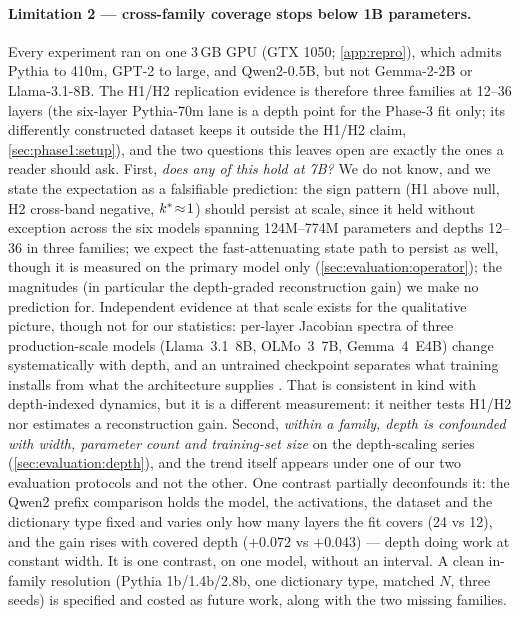 \paragraph{Limitation 2 --- cross-family coverage stops below 1B parameters.}
Every experiment ran on one 3\,GB GPU (GTX 1050;
\cref{app:repro}), which admits Pythia to 410m, GPT-2 to large, and
Qwen2-0.5B, but not Gemma-2-2B or Llama-3.1-8B. The H1/H2 replication evidence
is therefore three families at 12--36 layers (the six-layer Pythia-70m lane is
a depth point for the Phase-3 fit only; its differently constructed dataset
keeps it outside the H1/H2 claim, \cref{sec:phase1:setup}), and the two
questions this leaves
open are exactly the ones a reader should ask. First, \emph{does any of this
hold at 7B?} We do not know, and we state the expectation as a falsifiable
prediction: the sign pattern (H1 above null, H2 cross-band negative,
$k^{\ast}\!\approx\!1$) should persist at scale, since it
held without exception across the six models spanning 124M--774M
parameters and depths 12--36 in three
families; we expect the fast-attenuating state path to persist as well, though
it is measured on the primary model only (\cref{sec:evaluation:operator}); the
magnitudes (in particular the depth-graded reconstruction gain)
we make no prediction for. Independent evidence at that scale exists for the
qualitative picture, though not for our statistics: per-layer Jacobian
spectra of three production-scale models (Llama~3.1~8B, OLMo~3~7B,
Gemma~4~E4B) change systematically with depth, and an untrained checkpoint
separates what training installs from what the architecture supplies
\citep{fernando2026dynamics}. That is consistent in kind with depth-indexed
dynamics, but it is a different measurement: it neither tests H1/H2 nor
estimates a reconstruction gain. Second, \emph{within a family, depth is confounded
with width, parameter count and training-set size} on the depth-scaling series
(\cref{sec:evaluation:depth}), and the trend itself appears under one of our
two evaluation protocols and not the other. One contrast partially deconfounds it: the
Qwen2 prefix comparison holds the model, the activations, the dataset and the
dictionary
type fixed and varies only how many layers the fit covers (24 vs 12), and the
gain rises with covered depth ($+0.072$ vs $+0.043$) --- depth doing work at
constant width. It is one contrast, on one model, without an interval. A clean
in-family resolution (Pythia 1b/1.4b/2.8b, one
dictionary type, matched $N$, three seeds) is specified and costed as future
work, along with the two missing families.

